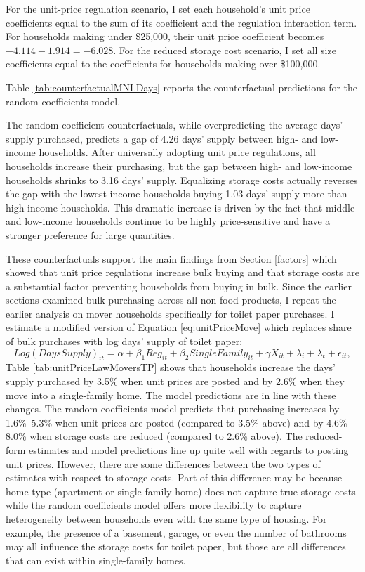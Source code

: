 \documentclass[AER]{AEA_mal}
\begin{document}
For the unit-price regulation scenario, I set each household's unit price coefficients equal to the sum of its coefficient and the regulation interaction term. For households making under \$25,000, their unit price coefficient becomes $-4.114 - 1.914 = -6.028$. For the reduced storage cost scenario, I set all size coefficients equal to the coefficients for households making over \$100,000.

Table \ref{tab:counterfactualMNLDays} reports the counterfactual predictions for the random coefficients model.



The random coefficient counterfactuals, while overpredicting the average days' supply purchased, predicts a gap of 4.26 days' supply between high- and low-income households. After universally adopting unit price regulations, all households increase their purchasing, but the gap between high- and low-income households shrinks to 3.16 days' supply. Equalizing storage costs actually reverses the gap with the lowest income households buying 1.03 days' supply more than high-income households. This dramatic increase is driven by the fact that middle- and low-income households continue to be highly price-sensitive and have a stronger preference for large quantities.

These counterfactuals support the main findings from Section \ref{factors} which showed that unit price regulations increase bulk buying and that storage costs are a substantial factor preventing households from buying in bulk. Since the earlier sections examined bulk purchasing across all non-food products, I repeat the earlier analysis on mover households specifically for toilet paper purchases. I estimate a modified version of Equation \ref{eq:unitPriceMove} which replaces share of bulk purchases with log days' supply of toilet paper:
\begin{equation}
\label{eq:unitPriceMoveTP}
Log(DaysSupply)_{it} = \alpha + \beta_1 Reg_{it} + \beta_2 SingleFamily_{it} + \gamma X_{it} + \lambda_i + \lambda_t + \epsilon_{it},
\end{equation}
Table \ref{tab:unitPriceLawMoversTP} shows that households increase the days' supply purchased by 3.5\% when unit prices are posted and by 2.6\% when they move into a single-family home. The model predictions are in line with these changes. The random coefficients model predicts that purchasing increases by 1.6\%--5.3\% when unit prices are posted (compared to 3.5\% above) and by 4.6\%--8.0\% when storage costs are reduced (compared to 2.6\% above). The reduced-form estimates and model predictions line up quite well with regards to posting unit prices. However, there are some differences between the two types of estimates with respect to storage costs. Part of this difference may be because home type (apartment or single-family home) does not capture true storage costs while the random coefficients model offers more flexibility to capture heterogeneity between households even with the same type of housing. For example, the presence of a basement, garage, or even the number of bathrooms may all influence the storage costs for toilet paper, but those are all differences that can exist within single-family homes.
\end{document}
